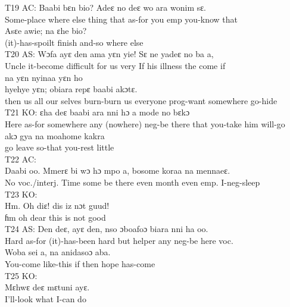 \documentclass[output=paper,colorlinks,citecolor=brown]{langscibook}
\begin{document}
    \z
\ex
    T19 AC:
    \ea
    \gll    Baabi bɛn bio? Adeɛ no deɛ wo ara wonim sɛ. \\
            Some-place where else thing that as-for you emp you-know that \\
    \ex
    \gll    Asɛe awie; na ɛhe bio?\\
            (it)-has-spoilt finish and-so where else \\
    \z
\ex
    T20 AS:
    \ea
    \gll    Wɔfa ayɛ den ama yɛn yie! Sɛ ne yadeɛ no ba a, \\
            Uncle it-become difficult for us very If his illness the come if \\
    \ex
    \gll    na yɛn nyinaa yɛn ho \\ hyehye yɛn; obiara repɛ baabi akɔtɛ.\\
            then us all our selves burn-burn us everyone prog-want somewhere go-hide\\
    \z
\ex
    T21 KO:
    \ea
    \gll    ɛha deɛ baabi ara nni hɔ a mode no bɛkɔ \\
            Here as-for somewhere any (nowhere) neg-be there that you-take him will-go \\
    \ex
    \gll    akɔ gya na moahome kakra\\
            go leave so-that you-rest little \\
    \z
\ex
    T22 AC:\\
    \gll    Daabi oo. Mmerɛ bi wɔ hɔ mpo a, bosome koraa na mennaeɛ.\\
            No voc./interj. Time some be there even month even emp. I-neg-sleep \\
\ex
    T23 KO:\\
    \gll    Hm. Oh diɛ! dis iz nɔt guud!\\
            ɦm oh dear this is not good\\
\ex
    T24 AS:
    \ea
    \gll    Den deɛ, ayɛ den, nso ɔboafoɔ biara nni ha oo.\\
            Hard as-for (it)-has-been hard but helper any neg-be here voc.\\
    \ex
    \gll    Woba sei a, na anidasoɔ aba. \\
            You-come like-this if then hope has-come\\
    \z
\ex
    T25 KO:\\
    \gll    Mɛhwɛ deɛ mɛtuni ayɛ.\\
 	        I’ll-look what I-can do\\
\z
\end{document}
